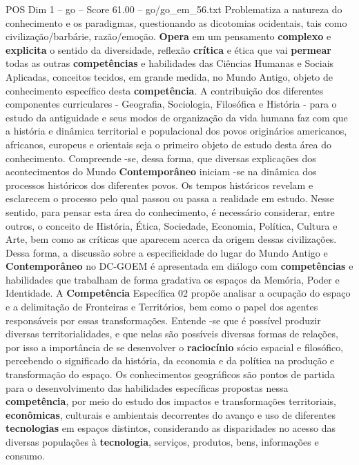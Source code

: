 \begin{textsample}{POS Dim 1 – go – Score 61.00 – go/go\_em\_56.txt}
Problematiza a natureza do conhecimento e os paradigmas, questionando as dicotomias ocidentais, tais como civilização/barbárie, razão/emoção. \textbf{Opera} em um pensamento \textbf{complexo} e \textbf{explicita} o sentido da diversidade, reflexão \textbf{crítica} e ética que vai \textbf{permear} todas as outras \textbf{competências} e habilidades das Ciências Humanas e Sociais Aplicadas, conceitos tecidos, em grande medida, no Mundo Antigo, objeto de conhecimento específico desta \textbf{competência}.
A contribuição dos diferentes componentes curriculares - Geografia, Sociologia, Filosófica e História - para o estudo da antiguidade e seus modos de organização da vida humana faz com que a história e dinâmica territorial e populacional dos povos originários americanos, africanos, europeus e orientais seja o primeiro objeto de estudo desta área do conhecimento.
Compreende -se, dessa forma, que diversas explicações dos acontecimentos do Mundo \textbf{Contemporâneo} iniciam -se na dinâmica dos processos históricos dos diferentes povos.
Os tempos históricos revelam e esclarecem o processo pelo qual passou ou passa a realidade em estudo.
Nesse sentido, para pensar esta área do conhecimento, é necessário considerar, entre outros, o conceito de História, Ética, Sociedade, Economia, Política, Cultura e Arte, bem como as críticas que aparecem acerca da origem dessas civilizações.
Dessa forma, a discussão sobre a especificidade do lugar do Mundo Antigo e \textbf{Contemporâneo} no DC-GOEM é apresentada em diálogo com \textbf{competências} e habilidades que trabalham de forma gradativa os espaços da Memória, Poder e Identidade.
A \textbf{Competência} Específica 02 propõe analisar a ocupação do espaço e a delimitação de Fronteiras e Territórios, bem como o papel dos agentes responsáveis por essas transformações.
Entende -se que é possível produzir diversas territorialidades, e que nelas são possíveis diversas formas de relações, por isso a importância de se desenvolver o \textbf{raciocínio} sócio espacial e filosófico, percebendo o significado da história, da economia e da política na produção e transformação do espaço.
Os conhecimentos geográficos são pontos de partida para o desenvolvimento das habilidades específicas propostas nessa \textbf{competência}, por meio do estudo dos impactos e transformações territoriais, \textbf{econômicas}, culturais e ambientais decorrentes do avanço e uso de diferentes \textbf{tecnologias} em espaços distintos, considerando as disparidades no acesso das diversas populações à \textbf{tecnologia}, serviços, produtos, bens, informações e consumo.

\end{textsample}
